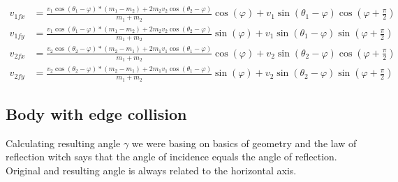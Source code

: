\documentclass[]{report}
\begin{document}
\begin{equation}
\begin{aligned}
\label{eq:final_equation}
v_{1fx} &= \frac{v_1 \cos(\theta_1 - \varphi)*(m_1-m_2) + 2m_2 v_2 \cos(\theta_2 - \varphi)}{m_1+m_2} \cos(\varphi) + v_1 \sin(\theta_1 - \varphi) \cos(\varphi + \frac{\pi}{2}) \\
v_{1fy} &= \frac{v_1 \cos(\theta_1 - \varphi)*(m_1-m_2) + 2m_2 v_2 \cos(\theta_2 - \varphi)}{m_1+m_2} \sin(\varphi) + v_1 \sin(\theta_1 - \varphi) \sin(\varphi + \frac{\pi}{2}) \\
v_{2fx} &=\frac{v_2 \cos(\theta_2 - \varphi)*(m_2-m_1) + 2m_1 v_1 \cos(\theta_1 - \varphi)}{m_1+m_2} \cos(\varphi) + v_2 \sin(\theta_2 - \varphi) \cos(\varphi + \frac{\pi}{2}) \\
v_{2fy} &= \frac{v_2 \cos(\theta_2 - \varphi)*(m_2-m_1) + 2m_1 v_1 \cos(\theta_1 - \varphi)}{m_1+m_2} \sin(\varphi) + v_2 \sin(\theta_2 - \varphi) \sin(\varphi + \frac{\pi}{2}) 
\end{aligned}
\end{equation}
\subsection{Body with edge collision}
Calculating resulting angle $\gamma$ we were basing on basics of geometry and the law of reflection witch says that the angle of incidence equals the angle of reflection. Original and resulting angle is always related to the horizontal axis. 
\end{document}
